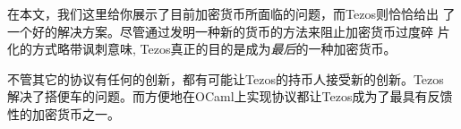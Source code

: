 \documentclass[letterpaper]{article}
\begin{document}
在本文，我们这里给你展示了目前加密货币所面临的问题，而Tezos则恰恰给出
了一个好的解决方案。尽管通过发明一种新的货币的方法来阻止加密货币过度碎
片化的方式略带讽刺意味, Tezos真正的目的是成为\emph{最后}的一种加密货币。

不管其它的协议有任何的创新，都有可能让Tezos的持币人接受新的创新。Tezos
解决了搭便车的问题。而方便地在OCaml上实现协议都让Tezos成为了最具有反馈
性的加密货币之一。



\end{document}
